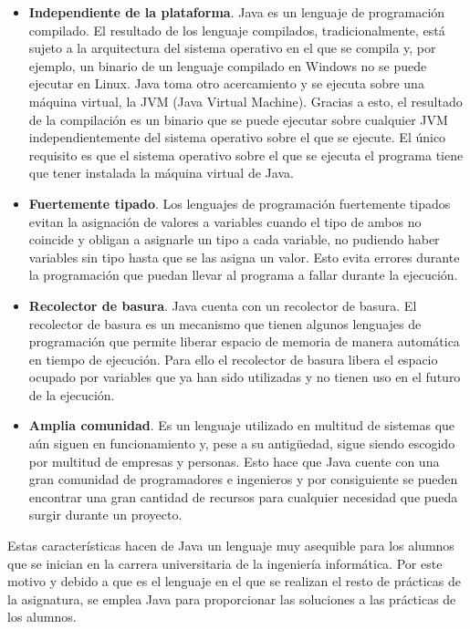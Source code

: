 \begin{itemize}
	\item \textbf{Independiente de la plataforma}. Java es un lenguaje de programación compilado. El resultado de los lenguaje compilados, tradicionalmente, está sujeto a la arquitectura del sistema operativo en el que se compila y, por ejemplo, un binario de un lenguaje compilado en Windows no se puede ejecutar en Linux. Java toma otro acercamiento y se ejecuta sobre una máquina virtual, la JVM (Java Virtual Machine). Gracias a esto, el resultado de la compilación es un binario que se puede ejecutar sobre cualquier JVM independientemente del sistema operativo sobre el que se ejecute. El único requisito es que el sistema operativo sobre el que se ejecuta el programa tiene que tener instalada la máquina virtual de Java.
	\item \textbf{Fuertemente tipado}. Los lenguajes de programación fuertemente tipados evitan la asignación de valores a variables cuando el tipo de ambos no coincide y obligan a asignarle un tipo a cada variable, no pudiendo haber variables sin tipo hasta que se las asigna un valor. Esto evita errores durante la programación que puedan llevar al programa a fallar durante la ejecución.
	\item \textbf{Recolector de basura}. Java cuenta con un recolector de basura. El recolector de basura es un mecanismo que tienen algunos lenguajes de programación que permite liberar espacio de memoria de manera automática en tiempo de ejecución. Para ello el recolector de basura libera el espacio ocupado por variables que ya han sido utilizadas y no tienen uso en el futuro de la ejecución.
	\item \textbf{Amplia comunidad}. Es un lenguaje utilizado en multitud de sistemas que aún siguen en funcionamiento y, pese a su antigüedad, sigue siendo escogido por multitud de empresas y personas. Esto hace que Java cuente con una gran comunidad de programadores e ingenieros y por consiguiente se pueden encontrar una gran cantidad de recursos para cualquier necesidad que pueda surgir durante un proyecto.
\end{itemize}

Estas características hacen de Java un lenguaje muy asequible para los alumnos que se inician en la carrera universitaria de la ingeniería informática. Por este motivo y debido a que es el lenguaje en el que se realizan el resto de prácticas de la asignatura, se emplea Java para proporcionar las soluciones a las prácticas de los alumnos.

